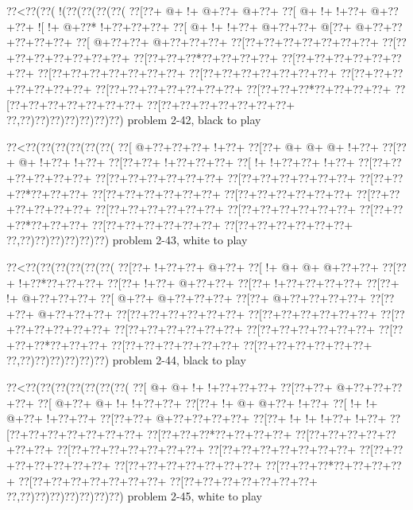 \vbox{\vbox{\goo
\0??<\0??(\0??(\- !(\0??(\0??(\0??(\0??(
\0??[\0??+\- @+\- !+\- @+\0??+\- @+\0??+
\0??[\- @+\- !+\- !+\0??+\- @+\0??+\0??+
\- ![\- !+\- @+\0??*\- !+\0??+\0??+\0??+
\0??[\- @+\- !+\- !+\0??+\- @+\0??+\0??+
\- @[\0??+\- @+\0??+\0??+\0??+\0??+\0??+
\0??[\- @+\0??+\0??+\- @+\0??+\0??+\0??+
\0??[\0??+\0??+\0??+\0??+\0??+\0??+\0??+
\0??[\0??+\0??+\0??+\0??+\0??+\0??+\0??+
\0??[\0??+\0??+\0??*\0??+\0??+\0??+\0??+
\0??[\0??+\0??+\0??+\0??+\0??+\0??+\0??+
\0??[\0??+\0??+\0??+\0??+\0??+\0??+\0??+
\0??[\0??+\0??+\0??+\0??+\0??+\0??+\0??+
\0??[\0??+\0??+\0??+\0??+\0??+\0??+\0??+
\0??[\0??+\0??+\0??+\0??+\0??+\0??+\0??+
\0??[\0??+\0??+\0??*\0??+\0??+\0??+\0??+
\0??[\0??+\0??+\0??+\0??+\0??+\0??+\0??+
\0??[\0??+\0??+\0??+\0??+\0??+\0??+\0??+
\0??,\0??)\0??)\0??)\0??)\0??)\0??)\0??)
}
\hfil problem 2-42, black to play\hfil\break
}

\vbox{\vbox{\goo
\0??<\0??(\0??(\0??(\0??(\0??(\0??(
\0??[\- @+\0??+\0??+\0??+\- !+\0??+
\0??[\0??+\- @+\- @+\- @+\- !+\0??+
\0??[\0??+\- @+\- !+\0??+\- !+\0??+
\0??[\0??+\0??+\- !+\0??+\0??+\0??+
\0??[\- !+\- !+\0??+\0??+\- !+\0??+
\0??[\0??+\0??+\0??+\0??+\0??+\0??+
\0??[\0??+\0??+\0??+\0??+\0??+\0??+
\0??[\0??+\0??+\0??+\0??+\0??+\0??+
\0??[\0??+\0??+\0??*\0??+\0??+\0??+
\0??[\0??+\0??+\0??+\0??+\0??+\0??+
\0??[\0??+\0??+\0??+\0??+\0??+\0??+
\0??[\0??+\0??+\0??+\0??+\0??+\0??+
\0??[\0??+\0??+\0??+\0??+\0??+\0??+
\0??[\0??+\0??+\0??+\0??+\0??+\0??+
\0??[\0??+\0??+\0??*\0??+\0??+\0??+
\0??[\0??+\0??+\0??+\0??+\0??+\0??+
\0??[\0??+\0??+\0??+\0??+\0??+\0??+
\0??,\0??)\0??)\0??)\0??)\0??)\0??)
}
\hfil problem 2-43, white to play\hfil\break
}

\vbox{\vbox{\goo
\0??<\0??(\0??(\0??(\0??(\0??(\0??(
\0??[\0??+\- !+\0??+\0??+\- @+\0??+
\0??[\- !+\- @+\- @+\- @+\0??+\0??+
\0??[\0??+\- !+\0??*\0??+\0??+\0??+
\0??[\0??+\- !+\0??+\- @+\0??+\0??+
\0??[\0??+\- !+\0??+\0??+\0??+\0??+
\0??[\0??+\- !+\- @+\0??+\0??+\0??+
\0??[\- @+\0??+\- @+\0??+\0??+\0??+
\0??[\0??+\- @+\0??+\0??+\0??+\0??+
\0??[\0??+\0??+\- @+\0??+\0??+\0??+
\0??[\0??+\0??+\0??+\0??+\0??+\0??+
\0??[\0??+\0??+\0??+\0??+\0??+\0??+
\0??[\0??+\0??+\0??+\0??+\0??+\0??+
\0??[\0??+\0??+\0??+\0??+\0??+\0??+
\0??[\0??+\0??+\0??+\0??+\0??+\0??+
\0??[\0??+\0??+\0??*\0??+\0??+\0??+
\0??[\0??+\0??+\0??+\0??+\0??+\0??+
\0??[\0??+\0??+\0??+\0??+\0??+\0??+
\0??,\0??)\0??)\0??)\0??)\0??)\0??)
}
\hfil problem 2-44, black to play\hfil\break
}

\vbox{\vbox{\goo
\0??<\0??(\0??(\0??(\0??(\0??(\0??(\0??(
\0??[\- @+\- @+\- !+\- !+\0??+\0??+\0??+
\0??[\0??+\0??+\- @+\0??+\0??+\0??+\0??+
\0??[\- @+\0??+\- @+\- !+\- !+\0??+\0??+
\0??[\0??+\- !+\- @+\- @+\0??+\- !+\0??+
\0??[\- !+\- !+\- @+\0??+\- !+\0??+\0??+
\0??[\0??+\0??+\- @+\0??+\0??+\0??+\0??+
\0??[\0??+\- !+\- !+\- !+\0??+\- !+\0??+
\0??[\0??+\0??+\0??+\0??+\0??+\0??+\0??+
\0??[\0??+\0??+\0??*\0??+\0??+\0??+\0??+
\0??[\0??+\0??+\0??+\0??+\0??+\0??+\0??+
\0??[\0??+\0??+\0??+\0??+\0??+\0??+\0??+
\0??[\0??+\0??+\0??+\0??+\0??+\0??+\0??+
\0??[\0??+\0??+\0??+\0??+\0??+\0??+\0??+
\0??[\0??+\0??+\0??+\0??+\0??+\0??+\0??+
\0??[\0??+\0??+\0??*\0??+\0??+\0??+\0??+
\0??[\0??+\0??+\0??+\0??+\0??+\0??+\0??+
\0??[\0??+\0??+\0??+\0??+\0??+\0??+\0??+
\0??,\0??)\0??)\0??)\0??)\0??)\0??)\0??)
}
\hfil problem 2-45, white to play\hfil\break
}

